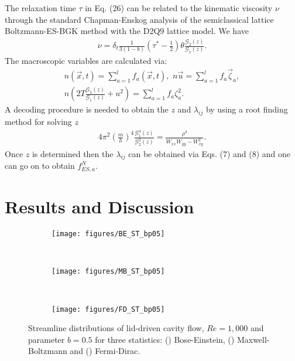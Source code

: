 \documentclass[doublecol]{epl2}
\begin{document}
The relaxation time $\tau$ in Eq. (26) can be related to the kinematic viscosity $\nu$ through the standard
Chapman-Enskog analysis \cite{Henon87, Qian1} of the semiclassical lattice Boltzmann-ES-BGK method with the D2Q9 lattice model.  We have
\begin{align}
 \nu =\delta_t \frac{1}{3(1-b)}( \tau^* - \frac{1}{2}) \theta \frac{\mathcal{G}_{2}(z)}{\mathcal{G}_{1}(z)}.
\end{align}
The macroscopic variables are calculated via:
\begin{align}
n(\vec x, t) = \sum_{a=1}^l  f_a(\vec x, t), \,\,
n\vec u = \sum_{a=1}^l  f_a \vec \zeta_a, \nonumber \\
 n (2 T \frac{\mathcal{G}_{2}(z)}{\mathcal{G}_{1}(z)} + u^2) = \sum_{a=1}^l f_a \zeta_a^2.
\end{align}
A decoding procedure is needed to obtain the $z$ and $\lambda_{ij}$ by using a root finding method for solving $z$
\begin{align}
4 \pi^2 \left(\frac{m}{h}\right)^4 \frac{\mathcal{G}^4_{1}(z)}{ \mathcal{G}^2_{2}(z)}= \frac{\rho^4}{W_{xx}W_{yy}-W_{xy}^2}.
\end{align}
Once $z$ is determined then the $\lambda_{ij}$ can be obtained via Eqs. (7) and (8) and one can go on to obtain $f^N_{ES,a}$.

\section{Results and Discussion}

\begin{figure*}[ht]
\centering
        \begin{subfigure}[b]{0.3\textwidth}
                \centering
                \texttt{[image: figures/BE\_ST\_bp05]}
                \caption{ }
                \label{fig:BE_Streamlines_bp05}
        \end{subfigure}%
				~
				\begin{subfigure}[b]{0.3\textwidth}
                \centering
                \texttt{[image: figures/MB\_ST\_bp05]}
                \caption{ }
                \label{fig:MB_Streamlines_bp05}
        \end{subfigure}%
				~
				\begin{subfigure}[b]{0.3\textwidth}
                \centering
                \texttt{[image: figures/FD\_ST\_bp05]}
                \caption{ }
                \label{fig:FD_Streamlines_bp05}
        \end{subfigure}%
	\caption{Streamline distributions of lid-driven cavity flow, $Re=1,000$ and parameter $b=0.5$ for three statistics:
	() Bose-Einstein, () Maxwell-Boltzmann and
 	() Fermi-Dirac.}
	\label{fig:Streamlines_bp05}
\end{figure*}
\end{document}
